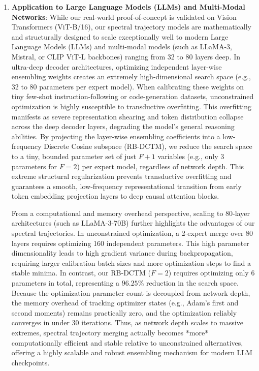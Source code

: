 \begin{enumerate}
    \item \textbf{Application to Large Language Models (LLMs) and Multi-Modal Networks}:
    While our real-world proof-of-concept is validated on Vision Transformers (ViT-B/16), our spectral trajectory models are mathematically and structurally designed to scale exceptionally well to modern Large Language Models (LLMs) and multi-modal models (such as LLaMA-3, Mistral, or CLIP ViT-L backbones) ranging from 32 to 80 layers deep. 
    In ultra-deep decoder architectures, optimizing independent layer-wise ensembling weights creates an extremely high-dimensional search space (e.g., 32 to 80 parameters per expert model). When calibrating these weights on tiny few-shot instruction-following or code-generation datasets, unconstrained optimization is highly susceptible to transductive overfitting. This overfitting manifests as severe representation shearing and token distribution collapse across the deep decoder layers, degrading the model's general reasoning abilities. 
    By projecting the layer-wise ensembling coefficients into a low-frequency Discrete Cosine subspace (RB-DCTM), we reduce the search space to a tiny, bounded parameter set of just $F+1$ variables (e.g., only $3$ parameters for $F=2$) per expert model, regardless of network depth. This extreme structural regularization prevents transductive overfitting and guarantees a smooth, low-frequency representational transition from early token embedding projection layers to deep causal attention blocks. 
    
    From a computational and memory overhead perspective, scaling to 80-layer architectures (such as LLaMA-3-70B) further highlights the advantages of our spectral trajectories. In unconstrained optimization, a 2-expert merge over 80 layers requires optimizing 160 independent parameters. This high parameter dimensionality leads to high gradient variance during backpropagation, requiring larger calibration batch sizes and more optimization steps to find a stable minima. In contrast, our RB-DCTM ($F=2$) requires optimizing only 6 parameters in total, representing a $96.25\%$ reduction in the search space. Because the optimization parameter count is decoupled from network depth, the memory overhead of tracking optimizer states (e.g., Adam's first and second moments) remains practically zero, and the optimization reliably converges in under 30 iterations. Thus, as network depth scales to massive extremes, spectral trajectory merging actually becomes *more* computationally efficient and stable relative to unconstrained alternatives, offering a highly scalable and robust ensembling mechanism for modern LLM checkpoints.


\end{enumerate}
